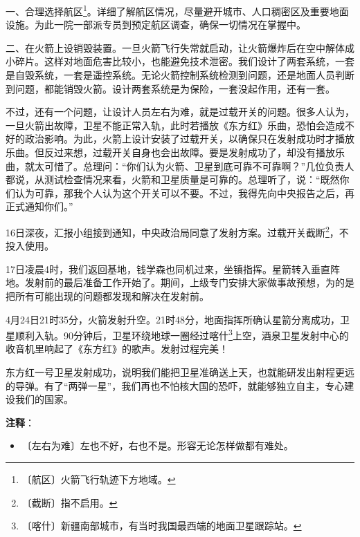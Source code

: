 \documentclass[12pt,UTF-8,openany]{ctexbook}
\begin{document}
\begin{normalsize}
    一、合理选择航区\footnote{〔航区〕火箭飞行轨迹下方地域。}。详细了解航区情况，尽量避开城市、人口稠密区及重要地面设施。为此一院一部派专员到预定航区调查，确保一切情况在掌握中。
    
    二、在火箭上设销毁装置。一旦火箭飞行失常就启动，让火箭爆炸后在空中解体成小碎片。这样对地面危害比较小，也能避免技术泄密。我们设计了两套系统，一套是自毁系统，一套是遥控系统。无论火箭控制系统检测到问题，还是地面人员判断到问题，都能销毁火箭。设计两套系统是为保险，一套没起作用，还有一套。
    
    不过，还有一个问题，让设计人员左右为难，就是过载开关的问题。很多人认为，一旦火箭出故障，卫星不能正常入轨，此时若播放《东方红》乐曲，恐怕会造成不好的政治影响。为此，火箭上设计安装了过载开关，以确保只在发射成功时才播放乐曲。但反过来想，过载开关自身也会出故障。要是发射成功了，却没有播放乐曲，就太可惜了。总理问：“你们认为火箭、卫星到底可靠不可靠啊？”几位负责人都说，从测试检查情况来看，火箭和卫星质量是可靠的。总理听了，说：“既然你们认为可靠，那我个人认为这个开关可以不要。不过，我得先向中央报告之后，再正式通知你们。”
    
    16日深夜，汇报小组接到通知，中央政治局同意了发射方案。过载开关截断\footnote{〔截断〕指不启用。}，不投入使用。
    
    17日凌晨4时，我们返回基地，钱学森也同机过来，坐镇指挥。星箭转入垂直阵地。发射前的最后准备工作开始了。期间，上级专门安排大家做事故预想，为的是把所有可能出现的问题都发现和解决在发射前。
    
    4月24日21时35分，火箭发射升空。21时48分，地面指挥所确认星箭分离成功，卫星顺利入轨。90分钟后，卫星环绕地球一圈经过喀什\footnote{〔喀什〕新疆南部城市，有当时我国最西端的地面卫星跟踪站。}上空，酒泉卫星发射中心的收音机里响起了《东方红》的歌声。发射过程完美！
    
    东方红一号卫星发射成功，说明我们能把卫星准确送上天，也就能研发出射程更远的导弹。有了“两弹一星”，我们再也不怕核大国的恐吓，就能够独立自主，专心建设我们的国家。
    
\end{normalsize}


\newpage

\textbf{注释}：

\vspace{-1em}

\begin{itemize}
    \setlength\itemsep{-0.2em}
    \item 〔左右为难〕左也不好，右也不是。形容无论怎样做都有难处。
\end{itemize}
\end{document}
